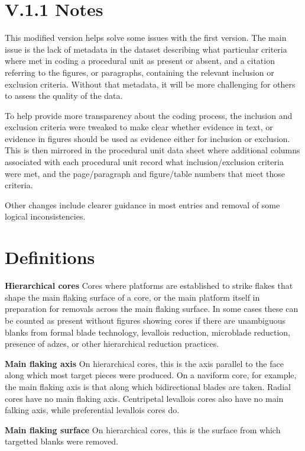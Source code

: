 \documentclass[
]{article}
\begin{document}
\section{V.1.1 Notes}\label{v.1.1-notes}

This modified version helps solve some issues with the first version.
The main issue is the lack of metadata in the dataset describing what
particular criteria where met in coding a procedural unit as present or
absent, and a citation referring to the figures, or paragraphs,
containing the relevant inclusion or exclusion criteria. Without that
metadata, it will be more challenging for others to assess the quality
of the data.

To help provide more transparency about the coding process, the
inclusion and exclusion criteria were tweaked to make clear whether
evidence in text, or evidence in figures should be used as evidence
either for inclusion or exclusion. This is then mirrored in the
procedural unit data sheet where additional columns associated with each
procedural unit record what inclusion/exclusion criteria were met, and
the page/paragraph and figure/table numbers that meet those criteria.

Other changes include clearer guidance in most entries and removal of
some logical inconsistencies.

\section{Definitions}\label{definitions}

\textbf{Hierarchical cores} Cores where platforms are established to
strike flakes that shape the main flaking surface of a core, or the main
platform itself in preparation for removals across the main flaking
surface. In some cases these can be counted as present without figures
showing cores if there are unambiguous blanks from formal blade
technology, levallois reduction, microblade reduction, presence of
adzes, or other hierarchical reduction practices.

\textbf{Main flaking axis} On hierarchical cores, this is the axis
parallel to the face along which most target pieces were produced. On a
naviform core, for example, the main flaking axis is that along which
bidirectional blades are taken. Radial cores have no main flaking axis.
Centripetal levallois cores also have no main falking axis, while
preferential levallois cores do.

\textbf{Main flaking surface} On hierarchical cores, this is the surface
from which targetted blanks were removed.
\end{document}
